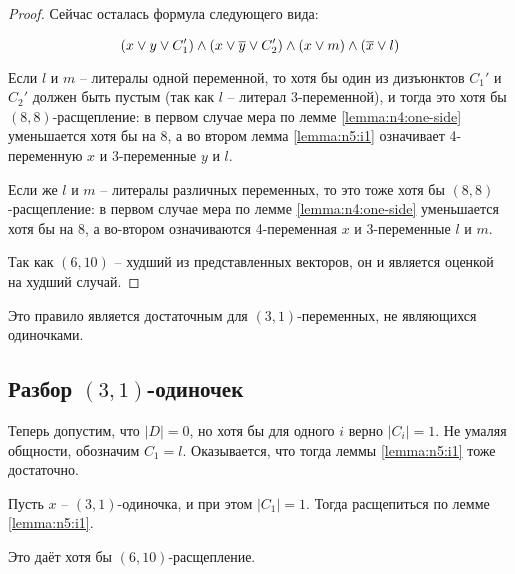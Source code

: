 \begin{proof}
 Сейчас осталась формула следующего вида:

 $$
  (x \vee y \vee C_1') \wedge (x \vee \overline{y} \vee C_2') \wedge (x \vee m) \wedge (\overline{x} \vee l)
 $$

 Если $l$ и $m$ -- литералы одной переменной, то хотя бы один из дизъюнктов $C_1'$ и $C_2'$ должен быть пустым (так как $l$ -- литерал 3-переменной), и тогда это хотя бы $(8,8)$-расщепление: в первом случае мера по лемме \ref{lemma:n4:one-side} уменьшается хотя бы на 8, а во втором лемма \ref{lemma:n5:i1} означивает 4-переменную $x$ и 3-переменные $y$ и $l$.

 Если же $l$ и $m$ -- литералы различных переменных, то это тоже хотя бы $(8,8)$-расщепление: в первом случае мера по лемме \ref{lemma:n4:one-side} уменьшается хотя бы на 8, а во-втором означиваются 4-переменная $x$ и 3-переменные $l$ и $m$.

 Так как $(6,10)$ -- худший из представленных векторов, он и является оценкой на худший случай.
\end{proof}

Это правило является достаточным для $(3,1)$-переменных, не являющихся одиночками.

\subsection{Разбор $(3,1)$-одиночек}
\label{subsec:n4:31-2c}

Теперь допустим, что $|D| = 0$, но хотя бы для одного $i$ верно $|C_i| = 1$.
Не умаляя общности, обозначим $C_1 = l$.
Оказывается, что тогда леммы \ref{lemma:n5:i1} тоже достаточно.

\begin{brule}
 Пусть $x$ -- $(3,1)$-одиночка, и при этом $|C_1| = 1$.
 Тогда расщепиться по лемме \ref{lemma:n5:i1}.

 Это даёт хотя бы $(6,10)$-расщепление.
 \label{brule:n4:31:2c}
\end{brule}


